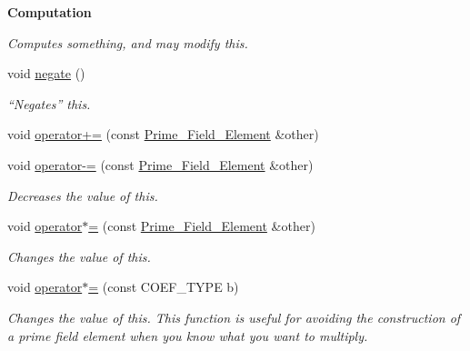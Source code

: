 \begin{Indent}\textbf{ Computation}\par
{\em Computes something, and may modify {\ttfamily this}. }\begin{DoxyCompactItemize}
\item 
\mbox{\label{class_prime___field___element_ab64fb1e850fb81bcf03345e11f5b6fb7}} 
void \hyperlink{class_prime___field___element_ab64fb1e850fb81bcf03345e11f5b6fb7}{negate} ()
\begin{DoxyCompactList}\small\item\em ``Negates'' {\ttfamily this}. \end{DoxyCompactList}\item 
void \hyperlink{class_prime___field___element_a28870a113aad5a9981512aca6c04d314}{operator+=} (const \hyperlink{class_prime___field___element}{Prime\+\_\+\+Field\+\_\+\+Element} \&other)
\item 
\mbox{\label{class_prime___field___element_a19e1cde9dd774d554d8a1d5889a23344}} 
void \hyperlink{class_prime___field___element_a19e1cde9dd774d554d8a1d5889a23344}{operator-\/=} (const \hyperlink{class_prime___field___element}{Prime\+\_\+\+Field\+\_\+\+Element} \&other)
\begin{DoxyCompactList}\small\item\em Decreases the value of {\ttfamily this}. \end{DoxyCompactList}\item 
\mbox{\label{class_prime___field___element_a1ef7c74bd84a82b7c346dd7fa4e4a480}} 
void \hyperlink{class_prime___field___element_a1ef7c74bd84a82b7c346dd7fa4e4a480}{operator$\ast$=} (const \hyperlink{class_prime___field___element}{Prime\+\_\+\+Field\+\_\+\+Element} \&other)
\begin{DoxyCompactList}\small\item\em Changes the value of {\ttfamily this}. \end{DoxyCompactList}\item 
\mbox{\label{class_prime___field___element_af441fbbc222a4231bb4e3e23690d4a10}} 
void \hyperlink{class_prime___field___element_af441fbbc222a4231bb4e3e23690d4a10}{operator$\ast$=} (const C\+O\+E\+F\+\_\+\+T\+Y\+PE b)
\begin{DoxyCompactList}\small\item\em Changes the value of {\ttfamily this}. This function is useful for avoiding the construction of a prime field element when you know what you want to multiply. \end{DoxyCompactList}\item 

\end{DoxyCompactItemize}
\end{Indent}
